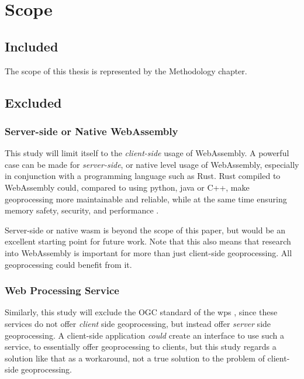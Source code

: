 \newpage
\section{Scope}
\subsection*{Included}
The scope of this thesis is represented by the Methodology chapter. 

\subsection*{Excluded}

\subsubsection*{ Server-side or Native WebAssembly } %

This study will limit itself to the \emph{client-side} usage of WebAssembly. 
A powerful case can be made for \emph{server-side}, or native level usage of WebAssembly, especially in conjunction with a programming language such as Rust. 
Rust compiled to WebAssembly could, compared to using python, java or C++, make geoprocessing more maintainable and reliable, while at the same time ensuring memory safety, security, and performance \cite{clack_standardizing_2019}. 

Server-side or native wasm is beyond the scope of this paper, but would be an excellent starting point for future work. Note that this also means that research into WebAssembly is important for more than just client-side geoprocessing. All geoprocessing could benefit from it.



\subsubsection*{ Web Processing Service } %

Similarly, this study will exclude the OGC standard of the \ac{wps} \cite{ogc_web_2015}, since these services do not offer \emph{client} side geoprocessing, but instead offer \emph{server} side geoprocessing. A client-side application \textit{could} create an interface to use such a service, to essentially offer geoprocessing to clients, but this study regards a solution like that as a workaround, not a true solution to the problem of client-side geoprocessing. 

